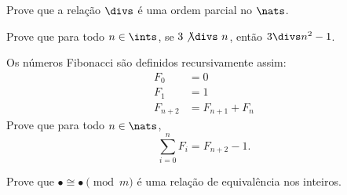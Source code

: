 \begin{exercise}
    Prove que a relação $\divs$ é uma ordem parcial no $\nats$.
\end{exercise}

\begin{exercise}
    Prove que para todo $n \in \ints$, se $3\not{\divs} \ n$, então $3 \divs n^2 - 1$.
\end{exercise}

\begin{exercise}
    Os números Fibonacci são definidos recursivamente assim:
    $$
        \begin{aligned}
            F_0 &= 0\\
            F_1 &= 1\\
            F_{n+2} &= F_{n+1} + F_n
        \end{aligned}
    $$
    Prove que para todo $n \in \nats$,
    $$
       \sum_{i=0}^{n} F_i = F_{n+2} - 1.
    $$
\end{exercise}

\begin{homework}
	Prove que $\bullet \cong \bullet \pmod m$ é uma relação de equivalência nos inteiros.
\end{homework}
